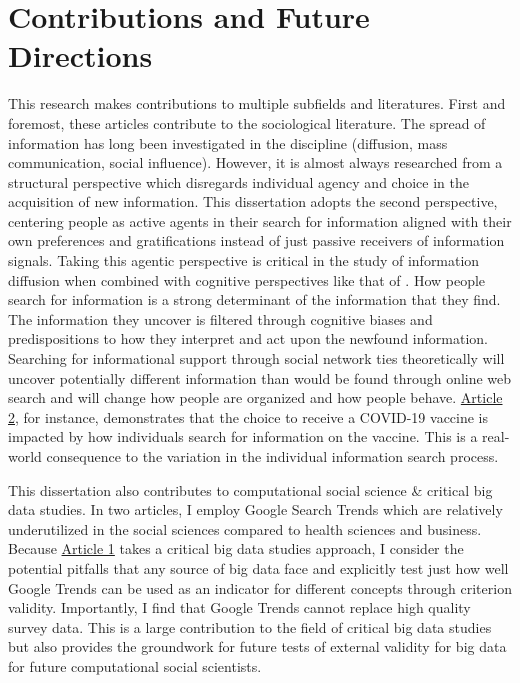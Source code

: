 \section{Contributions and Future Directions}

This research makes contributions to multiple subfields and literatures. 
First and foremost, these articles contribute to the sociological literature.
The spread of information has long been investigated in the discipline (diffusion, mass
communication, social influence). However, it is almost always researched from a structural
perspective which disregards individual agency and choice in the
acquisition of new information. This dissertation adopts the second perspective,
centering people as active agents in their search for information aligned
with their own preferences and gratifications instead of just
passive receivers of information signals.
Taking this agentic perspective is critical in the study of information
diffusion when combined with cognitive perspectives like that of
\citet{goldbergSocialContagionAssociative2018}. How people
search for information is a strong determinant of 
the information that they find. The information they uncover is filtered
through cognitive biases and predispositions to how they interpret and
act upon the newfound information. Searching for informational support
through social network ties theoretically will uncover potentially
different information than would be found through online web
search and will change how people are organized and how people behave.
\hyperlink{paper-2}{Article 2}, for instance, demonstrates that 
the choice to receive a COVID-19 vaccine is impacted by how
individuals search for information on the vaccine. 
This is a real-world consequence to the variation in the individual information
search process.

This dissertation also contributes to computational social science \&
critical big data studies. In two articles, I employ Google Search Trends 
which are relatively underutilized in the social sciences
compared to health sciences and business. Because \hyperlink{paper-1}{Article 1} 
takes a critical big data studies approach, I consider the potential
pitfalls that any source of big data face \citep{mcfarlandBigDataDanger2015} and explicitly
test just how well Google Trends can be used as an indicator for different concepts through
criterion validity. Importantly, I find that Google Trends cannot replace
high quality survey data. 
This is a large contribution to the field of critical big data studies but also provides
the groundwork for future tests of external validity for big data for future computational
social scientists.

